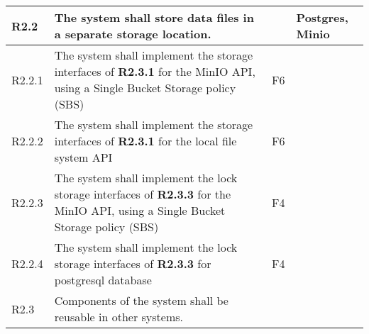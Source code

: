 \documentclass[a4paper,11pt]{article}
\begin{document}
\begin{landscape}
\begin{longtable}{|p{1cm}|p{19cm}|p{2cm}|p{3cm}|}
        \rowcolor[HTML]{DDDDDD}        R2.2       & The system shall store data files in a separate storage location.                                                                                                                                                                                                                     &                       & Postgres, Minio                          \\ \hline
        \rowcolor[HTML]{EEFFEE}        R2.2.1     & The system shall implement the storage interfaces of \textbf{R2.3.1} for the MinIO API, using a Single Bucket Storage policy (SBS)                                                                                                                                                    & F6                    &                                          \\\hline
        \rowcolor[HTML]{FFEEEE}        R2.2.2     & The system shall implement the storage interfaces of \textbf{R2.3.1} for the local file system API                                                                                                                                                                                    & F6                    &                                          \\\hline
        \rowcolor[HTML]{FFEEEE}        R2.2.3     & The system shall implement the lock storage interfaces of \textbf{R2.3.3} for the MinIO API, using a Single Bucket Storage policy (SBS)                                                                                                                                               & F4                    &                                          \\\hline
        \rowcolor[HTML]{FFEEEE}        R2.2.4     & The system shall implement the lock storage interfaces of \textbf{R2.3.3} for postgresql database                                                                                                                                                                                     & F4                    &                                          \\\hline
        \rowcolor[HTML]{DDDDDD}        R2.3       & Components of the system shall be reusable in other systems.                                                                                                                                                                                                                          &                       &                                          \\ \hline

\end{longtable}
\end{landscape}
\end{document}

